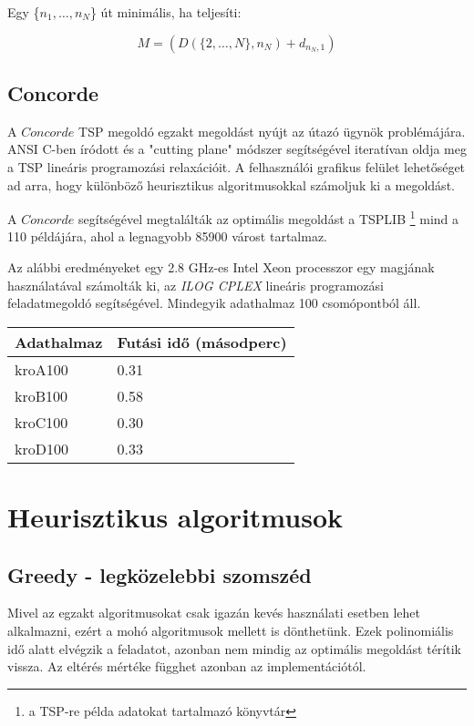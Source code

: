 Egy \{\(n_1, \dots, n_N\)\} út minimális, ha teljesíti:

\begin{equation}
M = (D(\{2, \dots, N\}, n_N)+d_{n_N, 1})
\end{equation}

\subsection{Concorde}

A \(Concorde\) TSP megoldó \cite{concorde} egzakt megoldást nyújt az útazó ügynök problémájára. ANSI C-ben íródott és a "cutting plane" módszer segítségével iteratívan oldja meg a TSP lineáris programozási relaxációit. A felhasználói grafikus felület lehetőséget ad arra, hogy különböző heurisztikus algoritmusokkal számoljuk ki a megoldást. 

A \(Concorde\) segítségével megtalálták az optimális megoldást a TSPLIB%
\footnote{ %
	a TSP-re példa adatokat tartalmazó könyvtár
}  %
mind a 110 példájára, ahol a legnagyobb 85900 várost tartalmaz.

Az alábbi eredményeket egy 2.8 GHz-es Intel Xeon processzor egy magjának használatával számolták ki, az \textit{ILOG CPLEX} lineáris programozási feladatmegoldó segítségével. Mindegyik adathalmaz 100 csomópontból áll.

\begin{table}[]
	\begin{tabular}{l|l}
		\textbf{Adathalmaz} & \textbf{Futási idő} (másodperc) \\
		\hline
		kroA100         & 0.31  \\
		kroB100         & 0.58 \\
		kroC100         & 0.30 \\   
		kroD100         & 0.33        
	\end{tabular}
\end{table}

\section{Heurisztikus algoritmusok}\label{sec:ALAP:adatelem}

\subsection{Greedy - legközelebbi szomszéd}

Mivel az egzakt algoritmusokat csak igazán kevés használati esetben lehet alkalmazni, ezért a mohó algoritmusok mellett is dönthetünk. Ezek polinomiális idő alatt elvégzik a feladatot, azonban nem mindig az optimális megoldást térítik vissza. Az eltérés mértéke függhet azonban az implementációtól.


